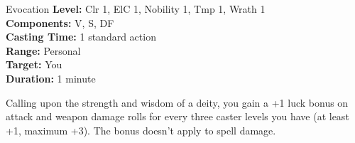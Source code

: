 {Evocation}
{
	\textbf{Level:}
	Clr 1, ElC 1, Nobility 1, Tmp 1, Wrath 1\\
	\textbf{Components:}
	V, S, DF\\
	\textbf{Casting Time:}
	1 standard action\\
	\textbf{Range:}
	Personal\\
	\textbf{Target:}
	You\\
	\textbf{Duration:}
	1 minute\\
}
{
	Calling upon the strength and wisdom of a deity, you gain a +1 luck bonus on attack and weapon damage rolls for every three caster levels you have (at least +1, maximum +3). The bonus doesn't apply to spell damage.

}
